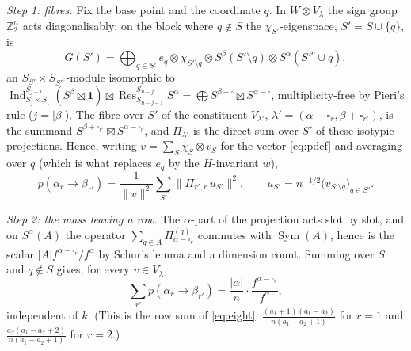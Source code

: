 \documentclass[11pt]{amsart}
\theoremstyle{definition}
\newcommand{\Z}{\mathbb Z}
\newcommand{\Ind}{\operatorname{Ind}}
\newcommand{\Res}{\operatorname{Res}}
\newcommand{\Sym}{\operatorname{Sym}}
\begin{document}
\emph{Step 1: fibres.} Fix the base point and the coordinate $q$. In $W\otimes V_\lambda$ the sign group $\Z_2^n$ acts diagonalisably; on the block where $q\notin S$ the $\chi_{S'}$-eigenspace, $S'=S\cup\{q\}$, is
\[
G(S')=\bigoplus_{q\in S'}e_q\otimes\chi_{S'\setminus q}\otimes S^\beta(S'\setminus q)\otimes S^\alpha(S'^c\cup q),
\]
an $S_{S'}\times S_{S'^c}$-module isomorphic to $\Ind_{S_j\times S_1}^{S_{j+1}}(S^\beta\boxtimes\mathbf1)\boxtimes\Res^{S_{n-j}}_{S_{n-j-1}}S^\alpha=\bigoplus S^{\beta+\square}\boxtimes S^{\alpha-\square}$, multiplicity-free by Pieri's rule ($j=|\beta|$). The fibre over $S'$ of the constituent $V_{\lambda'}$, $\lambda'=(\alpha-\square_r,\beta+\square_{r'})$, is the summand $S^{\beta+\square_{r'}}\boxtimes S^{\alpha-\square_r}$, and $\Pi_{\lambda'}$ is the direct sum over $S'$ of these isotypic projections. Hence, writing $v=\sum_S\chi_S\otimes v_S$ for the vector \eqref{eq:pdef} and averaging over $q$ (which is what replaces $e_q$ by the $H$-invariant $w$),
\[
p(\alpha_r\to\beta_{r'})=\frac1{\|v\|^2}\sum_{S'}\big\|\Pi_{r',r}\,u_{S'}\big\|^2,\qquad u_{S'}=n^{-1/2}\big(v_{S'\setminus q}\big)_{q\in S'} .
\]

\emph{Step 2: the mass leaving a row.} The $\alpha$-part of the projection acts slot by slot, and on $S^\alpha(A)$ the operator $\sum_{q\in A}\Pi^{(q)}_{\alpha-\square_r}$ commutes with $\Sym(A)$, hence is the scalar $|A|f^{\alpha-\square_r}/f^\alpha$ by Schur's lemma and a dimension count. Summing over $S$ and $q\notin S$ gives, for every $v\in V_\lambda$,
\begin{equation}\label{eq:rowmass}
\sum_{r'}p(\alpha_r\to\beta_{r'})=\frac{|\alpha|}n\cdot\frac{f^{\alpha-\square_r}}{f^\alpha},
\end{equation}
independent of $k$. (This is the row sum of \eqref{eq:eight}: $\frac{(a_1+1)(a_1-a_2)}{n(a_1-a_2+1)}$ for $r=1$ and $\frac{a_2(a_1-a_2+2)}{n(a_1-a_2+1)}$ for $r=2$.)
\end{document}
